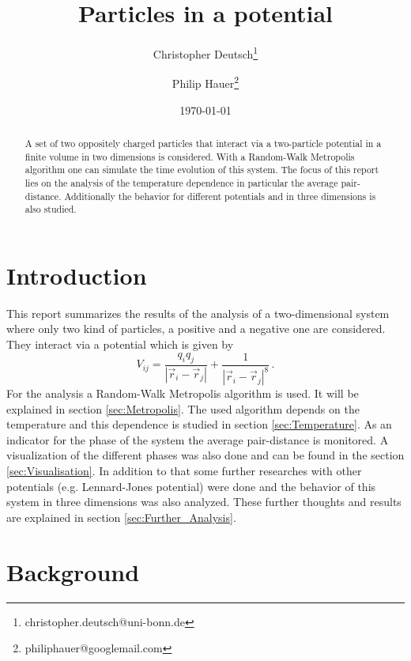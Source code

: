 \documentclass[11pt, a4paper]{article}
\title{Particles in a potential}
\author{Christopher Deutsch\footnote{christopher.deutsch@uni-bonn.de} \and Philip Hauer\footnote{philiphauer@googlemail.com}}
\date{\today}
\numberwithin{equation}{section}
\begin{document}
\begin{titlepage}

\maketitle

\begin{abstract}
\noindent 
A set of two oppositely charged particles that interact via a two-particle potential in a finite volume in two dimensions is considered.
With a Random-Walk Metropolis algorithm one can simulate the time evolution of this system.
The focus of this report lies on the analysis of the temperature dependence in particular the average pair-distance.
Additionally the behavior for different potentials and in three dimensions is also studied.
\end{abstract}

\end{titlepage}

\tableofcontents
\newpage


\section{Introduction}
This report summarizes the results of the analysis of a two-dimensional system where only two kind of particles, a positive and a negative one are considered.
They interact via a potential which is given by
\begin{equation}
V_{ij} = \frac{q_i q_j}{\left| \vec{r}_i - \vec{r}_j \right|} + \frac{1}{\left| \vec{r}_i - \vec{r}_j \right|^8} \, \text{.} \label{Eq:Potential}
\end{equation}
For the analysis a Random-Walk Metropolis algorithm is used. It will be explained in section \ref{sec:Metropolis}.
The used algorithm depends on the temperature and this dependence is studied in section \ref{sec:Temperature}.
As an indicator for the phase of the system the average pair-distance is monitored.
A visualization of the different phases was also done and can be found in the section \ref{sec:Visualisation}.
In addition to that some further researches with other potentials (e.g. Lennard-Jones potential) were done and the behavior of this system in three dimensions was also analyzed.
These further thoughts and results are explained in section \ref{sec:Further_Analysis}.


\section{Background}
\end{document}
